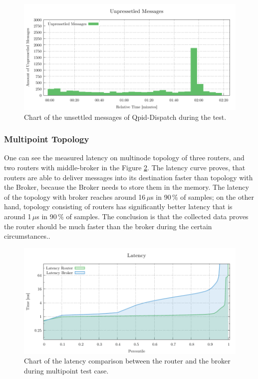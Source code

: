 \begin{figure}[H]
	\centering
	\includegraphics[width=1\linewidth]{obrazky-figures/charts/singlepoint-router-latency-routerLink.pdf}
	\caption{Chart of the unsettled messages of Qpid-Dispatch during the test.}
	\label{fig:latency-router-routerLink}
\end{figure}


\subsubsection*{Multipoint Topology}
One can see the measured latency on multinode topology of three routers, and two routers with middle-broker in the Figure \ref{fig:latency-multipoint-router}. The latency curve proves, that routers are able to deliver messages into its destination faster than topology with the Broker, because the Broker needs to store them in the memory. The latency of the topology with broker reaches around 16\,$\mu$s in 90\,\% of samples; on the other hand, topology consisting of routers has significantly better latency that is around 1\,$\mu$s in 90\,\% of samples. The conclusion is that the collected data proves the router should be much faster than the broker during the certain circumstances..

\begin{figure}[H]
	\centering
	\includegraphics[width=1\linewidth]{obrazky-figures/charts/multipoint-latency.pdf}
	\caption{Chart of the latency comparison between the router and the broker during multipoint test case.}
	\label{fig:latency-multipoint-router}
\end{figure}


